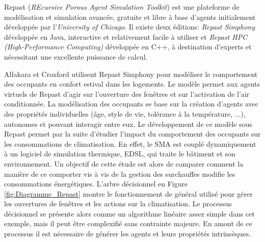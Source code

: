 Repast (\textit{REcursive Porous Agent Simulation Toolkit}) est une plateforme de modélisation et simulation avancée, gratuite et libre à base d'agents initialement développée par l'\textit{University of Chicago}. Il existe deux éditions: \textit{Repast Simphony} développée en Java, interactive et relativement facile à utiliser et \textit{Repast HPC (High-Performance Computing)} développée en C++, à destination d'experts et nécessitant une excellente puissance de calcul.

Alfakara et Croxford \cite{Alfakara-14} utilisent Repast Simphony pour modéliser le comportement des occupants en confort estival dans les logements. Le modèle permet aux agents virtuels de Repast d'agir sur l'ouverture des fenêtres et sur l'activation de l'air conditionnée. La modélisation des occupants se base sur la création d'agents avec des propriétés individuelles (âge, style de vie, tolérance à la température, ...), autonomes et pouvant interagir entre eux. Le développement de ce modèle sous Repast permet par la suite d'étudier l'impact du comportement des occupants sur les consommations de climatisation. En effet, le SMA est couplé dynamiquement à un logiciel de simulation thermique, EDSL, qui traite le bâtiment et son environnement. Un objectif de cette étude est alors de comparer comment la manière de ce comporter vis à vis de la gestion des surchauffes modifie les consommations énergétiques. L'arbre décisionnel en Figure \ref{fig:Diagramme_Repast} montre le fonctionnement de général utilisé pour gérer les ouvertures de fenêtres et les actions sur la climatisation. Le processus décisionnel se présente alors comme un algorithme linéaire assez simple dans cet exemple, mais il peut être complexifié sans contrainte majeure. En amont de ce processus il est nécessaire de générer les agents et leurs propriétés intrinsèques.


